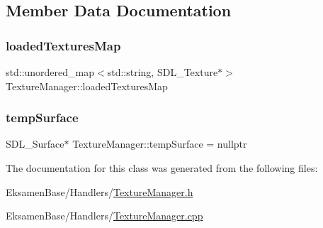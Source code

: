 \subsection{Member Data Documentation}
\mbox{\label{class_texture_manager_a2c91da057fc96141f7527dc7d2185417}} 
\subsubsection{\texorpdfstring{loaded\+Textures\+Map}{loadedTexturesMap}}
{\footnotesize\ttfamily std\+::unordered\+\_\+map$<$std\+::string, S\+D\+L\+\_\+\+Texture$\ast$$>$ Texture\+Manager\+::loaded\+Textures\+Map}

\mbox{\label{class_texture_manager_a29954bc68f26b374cd86849b8a35c9ff}} 
\subsubsection{\texorpdfstring{temp\+Surface}{tempSurface}}
{\footnotesize\ttfamily S\+D\+L\+\_\+\+Surface$\ast$ Texture\+Manager\+::temp\+Surface = nullptr}



The documentation for this class was generated from the following files\+:\begin{DoxyCompactItemize}
\item 
Eksamen\+Base/\+Handlers/\mbox{\hyperlink{_texture_manager_8h}{Texture\+Manager.\+h}}\item 
Eksamen\+Base/\+Handlers/\mbox{\hyperlink{_texture_manager_8cpp}{Texture\+Manager.\+cpp}}\end{DoxyCompactItemize}
